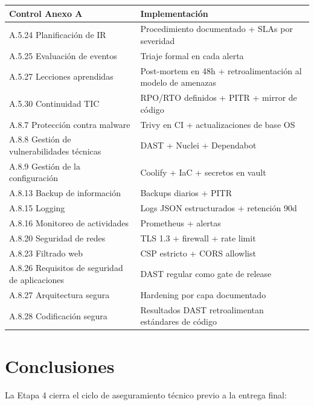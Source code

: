\documentclass[12pt,a4paper,oneside]{article}
\begin{document}
\begin{table}[h]
\centering
\small
\begin{tabularx}{\textwidth}{lX}
\toprule
\textbf{Control Anexo A} & \textbf{Implementación} \\
\midrule
A.5.24 Planificación de IR & Procedimiento documentado + SLAs por severidad \\
A.5.25 Evaluación de eventos & Triaje formal en cada alerta \\
A.5.27 Lecciones aprendidas & Post-mortem en 48h + retroalimentación al modelo de amenazas \\
A.5.30 Continuidad TIC & RPO/RTO definidos + PITR + mirror de código \\
A.8.7 Protección contra malware & Trivy en CI + actualizaciones de base OS \\
A.8.8 Gestión de vulnerabilidades técnicas & DAST + Nuclei + Dependabot \\
A.8.9 Gestión de la configuración & Coolify + IaC + secretos en vault \\
A.8.13 Backup de información & Backups diarios + PITR \\
A.8.15 Logging & Logs JSON estructurados + retención 90d \\
A.8.16 Monitoreo de actividades & Prometheus + alertas \\
A.8.20 Seguridad de redes & TLS 1.3 + firewall + rate limit \\
A.8.23 Filtrado web & CSP estricto + CORS allowlist \\
A.8.26 Requisitos de seguridad de aplicaciones & DAST regular como gate de release \\
A.8.27 Arquitectura segura & Hardening por capa documentado \\
A.8.28 Codificación segura & Resultados DAST retroalimentan estándares de código \\
\bottomrule
\end{tabularx}
\end{table}

\section{Conclusiones}

La Etapa 4 cierra el ciclo de aseguramiento técnico previo a la entrega final:
\end{document}
